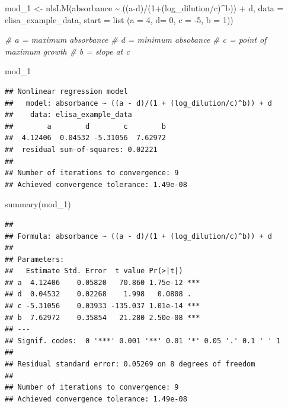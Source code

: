 \documentclass[
]{book}
\newenvironment{Shaded}{\begin{snugshade}}{\end{snugshade}}
\newcommand{\AttributeTok}[1]{\textcolor[rgb]{0.77,0.63,0.00}{#1}}
\newcommand{\CommentTok}[1]{\textcolor[rgb]{0.56,0.35,0.01}{\textit{#1}}}
\newcommand{\DecValTok}[1]{\textcolor[rgb]{0.00,0.00,0.81}{#1}}
\newcommand{\FunctionTok}[1]{\textcolor[rgb]{0.00,0.00,0.00}{#1}}
\newcommand{\NormalTok}[1]{#1}
\newcommand{\OtherTok}[1]{\textcolor[rgb]{0.56,0.35,0.01}{#1}}
\newcommand{\SpecialCharTok}[1]{\textcolor[rgb]{0.00,0.00,0.00}{#1}}
\begin{document}
\begin{Shaded}
\begin{Highlighting}[]
\NormalTok{mod\_1 }\OtherTok{\textless{}{-}} \FunctionTok{nlsLM}\NormalTok{(absorbance }\SpecialCharTok{\textasciitilde{}} 
\NormalTok{                 ((a}\SpecialCharTok{{-}}\NormalTok{d)}\SpecialCharTok{/}\NormalTok{(}\DecValTok{1}\SpecialCharTok{+}\NormalTok{(log\_dilution}\SpecialCharTok{/}\NormalTok{c)}\SpecialCharTok{\^{}}\NormalTok{b)) }\SpecialCharTok{+}\NormalTok{ d,}
\AttributeTok{data =}\NormalTok{ elisa\_example\_data, }
\AttributeTok{start =} \FunctionTok{list}\NormalTok{ (}\AttributeTok{a =} \DecValTok{4}\NormalTok{, }\AttributeTok{d=} \DecValTok{0}\NormalTok{, }\AttributeTok{c =} \SpecialCharTok{{-}}\DecValTok{5}\NormalTok{, }\AttributeTok{b =} \DecValTok{1}\NormalTok{))}

\CommentTok{\# a = maximum absorbance}
\CommentTok{\# d = minimum absobance}
\CommentTok{\# c = point of maximum growth }
\CommentTok{\# b = slope at c}

\NormalTok{mod\_1}
\end{Highlighting}
\end{Shaded}

\begin{verbatim}
## Nonlinear regression model
##   model: absorbance ~ ((a - d)/(1 + (log_dilution/c)^b)) + d
##    data: elisa_example_data
##        a        d        c        b 
##  4.12406  0.04532 -5.31056  7.62972 
##  residual sum-of-squares: 0.02221
## 
## Number of iterations to convergence: 9 
## Achieved convergence tolerance: 1.49e-08
\end{verbatim}

\begin{Shaded}
\begin{Highlighting}[]
\FunctionTok{summary}\NormalTok{(mod\_1)}
\end{Highlighting}
\end{Shaded}

\begin{verbatim}
## 
## Formula: absorbance ~ ((a - d)/(1 + (log_dilution/c)^b)) + d
## 
## Parameters:
##   Estimate Std. Error  t value Pr(>|t|)    
## a  4.12406    0.05820   70.860 1.75e-12 ***
## d  0.04532    0.02268    1.998   0.0808 .  
## c -5.31056    0.03933 -135.037 1.01e-14 ***
## b  7.62972    0.35854   21.280 2.50e-08 ***
## ---
## Signif. codes:  0 '***' 0.001 '**' 0.01 '*' 0.05 '.' 0.1 ' ' 1
## 
## Residual standard error: 0.05269 on 8 degrees of freedom
## 
## Number of iterations to convergence: 9 
## Achieved convergence tolerance: 1.49e-08
\end{verbatim}
\end{document}
